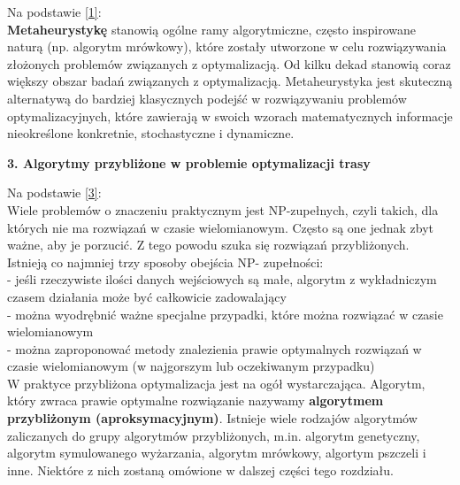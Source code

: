 \documentclass[a4paper, twoside, 12pt, justified]{article}
\begin{document}
	Na podstawie \hyperlink{metaheurystyka}{[1]}:\\ 
	\textbf{Metaheurystykę} stanowią ogólne ramy algorytmiczne, często inspirowane naturą (np. algorytm mrówkowy), które zostały utworzone w celu rozwiązywania złożonych problemów związanych z optymalizacją. Od kilku dekad stanowią coraz większy obszar badań związanych z optymalizacją. Metaheurystyka jest skuteczną alternatywą
	do bardziej klasycznych podejść w rozwiązywaniu problemów optymalizacyjnych, które zawierają w swoich wzorach matematycznych informacje nieokreślone konkretnie, stochastyczne i dynamiczne.\\
	

	
	\newpage
	
	
	\begin{flushleft}
		\begin{LARGE}
			\textbf{3. Algorytmy przybliżone w problemie
				optymalizacji trasy}
		\end{LARGE}
	\end{flushleft}
	
	\vspace{5mm} %

	Na podstawie \hyperlink{algorithm}{[3]}:\\
	Wiele problemów o znaczeniu praktycznym jest NP-zupełnych, czyli takich, dla których nie ma rozwiązań w czasie wielomianowym. Często są one jednak zbyt ważne, aby je porzucić. Z tego powodu szuka się rozwiązań przybliżonych. Istnieją co najmniej trzy sposoby obejścia NP- zupełności:\\
	- jeśli rzeczywiste ilości danych wejściowych są małe,
	algorytm z wykładniczym czasem działania może być całkowicie zadowalający\\
	- można wyodrębnić ważne specjalne przypadki, które można rozwiązać w czasie wielomianowym\\
	- można zaproponować metody znalezienia prawie optymalnych rozwiązań w czasie wielomianowym (w najgorszym lub oczekiwanym przypadku)\\
	
	W praktyce przybliżona optymalizacja jest na ogół wystarczająca. Algorytm, który zwraca prawie optymalne
	rozwiązanie nazywamy \textbf{algorytmem przybliżonym (aproksymacyjnym)}. Istnieje wiele rodzajów algorytmów zaliczanych do grupy algorytmów przybliżonych, m.in. algorytm genetyczny, algorytm symulowanego wyżarzania, algorytm mrówkowy, algortym pszczeli i inne. Niektóre z nich zostaną omówione w dalszej części tego rozdziału.\\
	
\end{document}
